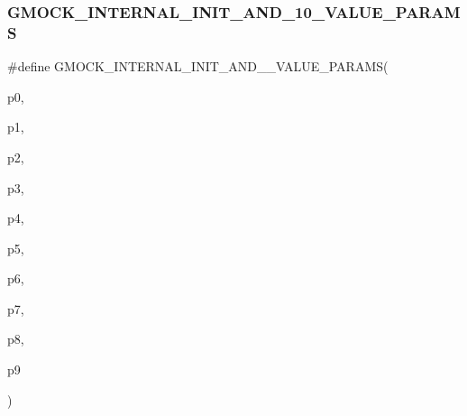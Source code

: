 \subsubsection{\texorpdfstring{GMOCK\_INTERNAL\_INIT\_AND\_10\_VALUE\_PARAMS}{GMOCK\_INTERNAL\_INIT\_AND\_10\_VALUE\_PARAMS}}
{\footnotesize\ttfamily \#define G\+M\+O\+C\+K\+\_\+\+I\+N\+T\+E\+R\+N\+A\+L\+\_\+\+I\+N\+I\+T\+\_\+\+A\+N\+D\+\_\+\_\+\+V\+A\+L\+U\+E\+\_\+\+P\+A\+R\+A\+MS(\begin{DoxyParamCaption}\item[{}]{p0,  }\item[{}]{p1,  }\item[{}]{p2,  }\item[{}]{p3,  }\item[{}]{p4,  }\item[{}]{p5,  }\item[{}]{p6,  }\item[{}]{p7,  }\item[{}]{p8,  }\item[{}]{p9 }\end{DoxyParamCaption})}

